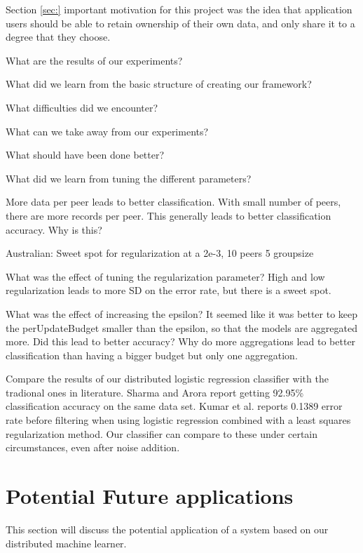 Section \ref{sec:} important motivation for this project was the idea that application users should be able to retain ownership of their own data, and only share it to a degree that they choose.




What are the results of our experiments?

What did we learn from the basic structure of creating our framework?

What difficulties did we encounter?

What can we take away from our experiments?

What should have been done better? 

What did we learn from tuning the different parameters?

More data per peer leads to better classification. With small number of peers, there are more records per peer. This generally leads to better classification accuracy. Why is this? 

Australian: Sweet spot for regularization at a 2e-3, 10 peers 5 groupsize

What was the effect of tuning the regularization parameter? High and low regularization leads to more SD on the error rate, but there is a sweet spot.

What was the effect of increasing the epsilon? 
	It seemed like it was better to keep the perUpdateBudget smaller than the epsilon, so that the models are aggregated more. Did this lead to better accuracy? Why do more aggregations lead to better classification than having a bigger budget but only one aggregation.
	
Compare the results of our distributed logistic regression classifier with the tradional ones in literature. Sharma and Arora \cite{sharma2013adaptive} report getting 92.95\% classification accuracy on the same data set. Kumar et al\cite{kumar2012comparative}. reports  0.1389 error rate before filtering when using logistic regression combined with a least squares regularization method. Our classifier can compare to these under certain circumstances, even after noise addition.  



\section{Potential Future applications}
This section will discuss the potential application of a system based on our distributed machine learner.

